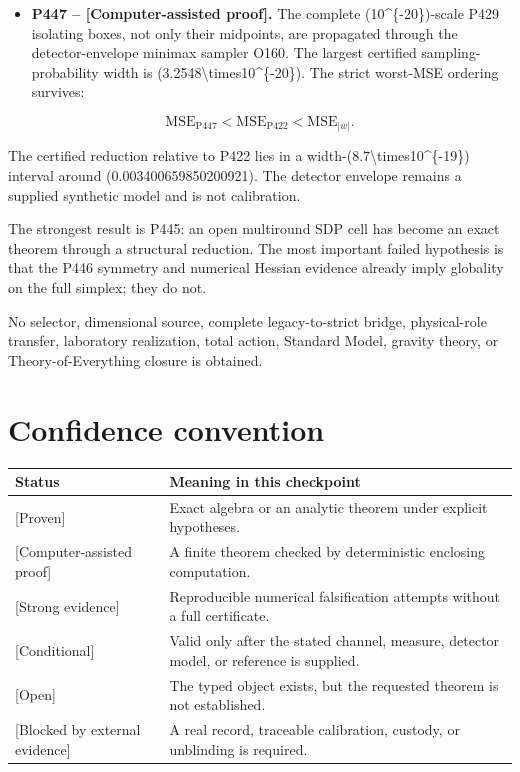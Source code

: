 \documentclass[11pt,a4paper,openany]{report}
\newcommand{\statusProven}{\textcolor{fingreen}{[Proven]}}
\newcommand{\statusStrong}{\textcolor{finblue}{[Strong evidence]}}
\begin{document}
\begin{itemize}
\item 
\textbf{P447 -- \textcolor{fingreen}{[Computer-assisted proof]}.} The complete (10\textasciicircum{}\{-20\})-scale P429 isolating boxes, not only their midpoints, are propagated through the detector-envelope minimax sampler O160. The largest certified sampling-probability width is (3.2548\textbackslash{}times10\textasciicircum{}\{-20\}). The strict worst-MSE ordering survives:

\end{itemize}

\[
\mathrm{MSE}_{\mathrm{P447}}
<\mathrm{MSE}_{\mathrm{P422}}
<\mathrm{MSE}_{|w|}.
\]

The certified reduction relative to P422 lies in a width-(8.7\textbackslash{}times10\textasciicircum{}\{-19\}) interval around (0.003400659850200921). The detector envelope remains a supplied synthetic model and is not calibration.

The strongest result is P445: an open multiround SDP cell has become an exact theorem through a structural reduction. The most important failed hypothesis is that the P446 symmetry and numerical Hessian evidence already imply globality on the full simplex; they do not.

No selector, dimensional source, complete legacy-to-strict bridge, physical-role transfer, laboratory realization, total action, Standard Model, gravity theory, or Theory-of-Everything closure is obtained.

\chapter{Confidence convention}

\begin{center}
\begingroup\small
\setlength{\tabcolsep}{2.5pt}
\renewcommand{\arraystretch}{1.16}
\begin{longtable}{@{}p{}p{}@{}}
\toprule
\textbf{Status} & \textbf{Meaning in this checkpoint} \\
\midrule
\endhead
\statusProven{} & Exact algebra or an analytic theorem under explicit hypotheses. \\
\textcolor{fingreen}{[Computer-assisted proof]} & A finite theorem checked by deterministic enclosing computation. \\
\statusStrong{} & Reproducible numerical falsification attempts without a full certificate. \\
\textcolor{finviolet}{[Conditional]} & Valid only after the stated channel, measure, detector model, or reference is supplied. \\
\textcolor{finorange}{[Open]} & The typed object exists, but the requested theorem is not established. \\
\textcolor{finred}{[Blocked by external evidence]} & A real record, traceable calibration, custody, or unblinding is required. \\
\bottomrule
\end{longtable}
\endgroup
\end{center}
\end{document}
